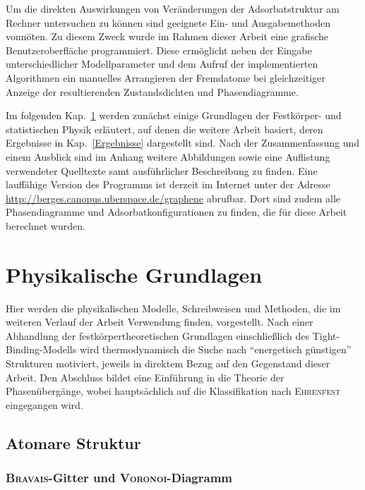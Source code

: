 \documentclass[a4paper, 10pt, twoside, openany]{book} %
\begin{document}
	Um die direkten Auswirkungen von Veränderungen der Adsorbatstruktur am Rechner untersuchen zu können sind geeignete Ein- und Ausgabemethoden vonnöten. Zu diesem Zweck wurde im Rahmen dieser Arbeit eine grafische Benutzeroberfläche programmiert. Diese ermöglicht neben der Eingabe unterschiedlicher Modellparameter und dem Aufruf der implementierten Algorithmen ein manuelles Arrangieren der Fremdatome bei gleichzeitiger Anzeige der resultierenden Zustandsdichten und Phasendiagramme.
	
	Im folgenden Kap.~\ref{Theorie} werden zunächst einige Grundlagen der Festkörper- und statistischen Physik erläutert, auf denen die weitere Arbeit basiert, deren Ergebnisse in Kap.~\ref{Ergebnisse} dargestellt sind. Nach der Zusammenfassung und einem Ausblick sind im Anhang weitere Abbildungen sowie eine Auflistung verwendeter Quelltexte samt ausführlicher Beschreibung zu finden. Eine lauffähige Version des Programms ist derzeit im Internet unter der Adresse \url{http://berges.canopus.uberspace.de/graphene} abrufbar. Dort sind zudem alle Phasendiagramme und Adsorbatkonfigurationen zu finden, die für diese Arbeit berechnet wurden.
	
    \chapter{Physikalische Grundlagen}
	\label{Theorie}
	
	Hier werden die physikalischen Modelle, Schreibweisen und Methoden, die im weiteren Verlauf der Arbeit Verwendung finden, vorgestellt. Nach einer Abhandlung der festkörpertheoretischen Grundlagen einschließlich des Tight-Binding-Modells wird thermodynamisch die Suche nach "`energetisch günstigen"' Strukturen motiviert, jeweils in direktem Bezug auf den Gegenstand dieser Arbeit. Den Abschluss bildet eine Einführung in die Theorie der Phasenübergänge, wobei hauptsächlich auf die Klassifikation nach \textsc{Ehrenfest} eingegangen wird.
	
	\section{Atomare Struktur}
	\label{Atomare Struktur}
	
	\subsection{\textsc{Bravais}-Gitter und \textsc{Voronoi}-Diagramm}
	\label{Bravais-Gitter}
	
\end{document}
